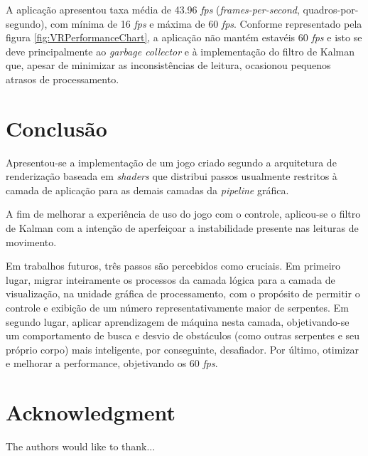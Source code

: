 \documentclass[conference]{IEEEtran}
\begin{document}
A aplicação apresentou taxa média de 43.96 \textit{fps} (\textit{frames-per-second}, quadros-por-segundo), com mínima de 16 \textit{fps} e máxima de 60 \textit{fps}. Conforme representado pela figura \ref{fig:VRPerformanceChart}, a aplicação não mantém estavéis 60 \textit{fps} e isto se deve principalmente ao \textit{garbage collector} e à implementação do filtro de Kalman que, apesar de minimizar as inconsistências de leitura, ocasionou pequenos atrasos de processamento.

\section{Conclusão}\label{sec:conclusion}
Apresentou-se a implementação de um jogo criado segundo a arquitetura de renderização baseada em \textit{shaders} que distribui passos usualmente restritos à camada de aplicação para as demais camadas da \textit{pipeline} gráfica.

A fim de melhorar a experiência de uso do jogo com o controle, aplicou-se o filtro de Kalman com a intenção de aperfeiçoar a instabilidade presente nas leituras de movimento.

Em trabalhos futuros, três passos são percebidos como cruciais. Em primeiro lugar, migrar inteiramente os processos da camada lógica para a camada de visualização, na unidade gráfica de processamento, com o propósito de permitir o controle e exibição de um número representativamente maior de serpentes. Em segundo lugar, aplicar aprendizagem de máquina nesta camada, objetivando-se um comportamento de busca e desvio de obstáculos (como outras serpentes e seu próprio corpo) mais inteligente, por conseguinte, desafiador. Por último, otimizar e melhorar a performance, objetivando os 60 \textit{fps}.





\section*{Acknowledgment}


The authors would like to thank...





\end{document}
